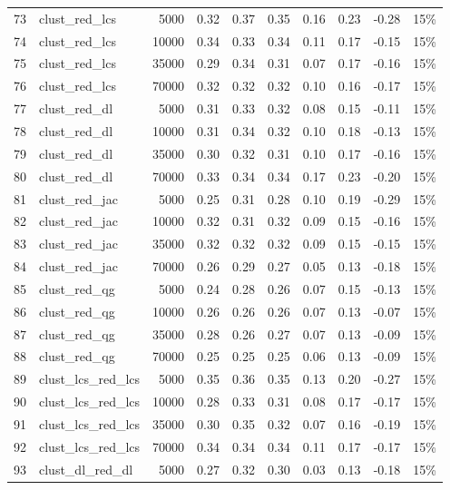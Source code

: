 \documentclass{praca1}
\begin{document}
\begin{table}[!h]
\begin{tabular}{|rlr|rrr|rr|r|r|}
   \hline
73 & clust\_red\_lcs & 5000 & 0.32 & 0.37 & 0.35 & 0.16 & 0.23 & -0.28 & 15\% \\ 
  74 & clust\_red\_lcs & 10000 & 0.34 & 0.33 & 0.34 & 0.11 & 0.17 & -0.15 & 15\% \\ 
  75 & clust\_red\_lcs & 35000 & 0.29 & 0.34 & 0.31 & 0.07 & 0.17 & -0.16 & 15\% \\ 
  76 & clust\_red\_lcs & 70000 & 0.32 & 0.32 & 0.32 & 0.10 & 0.16 & -0.17 & 15\% \\ 
   \hline
77 & clust\_red\_dl & 5000 & 0.31 & 0.33 & 0.32 & 0.08 & 0.15 & -0.11 & 15\% \\ 
  78 & clust\_red\_dl & 10000 & 0.31 & 0.34 & 0.32 & 0.10 & 0.18 & -0.13 & 15\% \\ 
  79 & clust\_red\_dl & 35000 & 0.30 & 0.32 & 0.31 & 0.10 & 0.17 & -0.16 & 15\% \\ 
  80 & clust\_red\_dl & 70000 & 0.33 & 0.34 & 0.34 & 0.17 & 0.23 & -0.20 & 15\% \\ 
   \hline
81 & clust\_red\_jac & 5000 & 0.25 & 0.31 & 0.28 & 0.10 & 0.19 & -0.29 & 15\% \\ 
  82 & clust\_red\_jac & 10000 & 0.32 & 0.31 & 0.32 & 0.09 & 0.15 & -0.16 & 15\% \\ 
  83 & clust\_red\_jac & 35000 & 0.32 & 0.32 & 0.32 & 0.09 & 0.15 & -0.15 & 15\% \\ 
  84 & clust\_red\_jac & 70000 & 0.26 & 0.29 & 0.27 & 0.05 & 0.13 & -0.18 & 15\% \\ 
   \hline
85 & clust\_red\_qg & 5000 & 0.24 & 0.28 & 0.26 & 0.07 & 0.15 & -0.13 & 15\% \\ 
  86 & clust\_red\_qg & 10000 & 0.26 & 0.26 & 0.26 & 0.07 & 0.13 & -0.07 & 15\% \\ 
  87 & clust\_red\_qg & 35000 & 0.28 & 0.26 & 0.27 & 0.07 & 0.13 & -0.09 & 15\% \\ 
  88 & clust\_red\_qg & 70000 & 0.25 & 0.25 & 0.25 & 0.06 & 0.13 & -0.09 & 15\% \\ 
   \hline
89 & clust\_lcs\_red\_lcs & 5000 & 0.35 & 0.36 & 0.35 & 0.13 & 0.20 & -0.27 & 15\% \\ 
  90 & clust\_lcs\_red\_lcs & 10000 & 0.28 & 0.33 & 0.31 & 0.08 & 0.17 & -0.17 & 15\% \\ 
  91 & clust\_lcs\_red\_lcs & 35000 & 0.30 & 0.35 & 0.32 & 0.07 & 0.16 & -0.19 & 15\% \\ 
  92 & clust\_lcs\_red\_lcs & 70000 & 0.34 & 0.34 & 0.34 & 0.11 & 0.17 & -0.17 & 15\% \\ 
   \hline
93 & clust\_dl\_red\_dl & 5000 & 0.27 & 0.32 & 0.30 & 0.03 & 0.13 & -0.18 & 15\% \\ 

\end{tabular}
\end{table}
\end{document}

